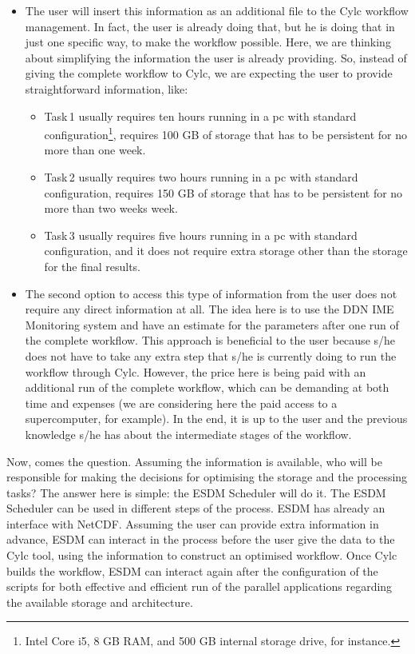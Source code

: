 \documentclass[a4paper]{article}
\begin{document}
\begin{itemize}

\item The user will insert this information as an additional file to the Cylc workflow management. In fact, the user is already doing that, but he is doing that in just one specific way, to make the workflow possible. Here, we are thinking about simplifying the information the user is already providing. So, instead of giving the complete workflow to Cylc, we are expecting the user to provide straightforward information, like:

\begin{itemize}

\item Task\,1 usually requires ten hours running in a pc with standard configuration\footnote{Intel Core i5, 8 GB RAM, and 500 GB internal storage drive, for instance.}, requires 100 GB of storage that has to be persistent for no more than one week.

\item Task\,2 usually requires two hours running in a pc with standard configuration, requires 150 GB of storage that has to be persistent for no more than two weeks week.

\item Task\,3 usually requires five hours running in a pc with standard configuration, and it does not require extra storage other than the storage for the final results.

\end{itemize}

\item The second option to access this type of information from the user does not require any direct information at all. The idea here is to use the DDN IME Monitoring system and have an estimate for the parameters after one run of the complete workflow. This approach is beneficial to the user because s/he does not have to take any extra step that s/he is currently doing to run the workflow through Cylc. However, the price here is being paid with an additional run of the complete workflow, which can be demanding at both time and expenses (we are considering here the paid access to a supercomputer, for example). In the end, it is up to the user and the previous knowledge s/he has about the intermediate stages of the workflow.

\end{itemize}

Now, comes the question. Assuming the information is available, who will be responsible for making the decisions for optimising the storage and the processing tasks? The answer here is simple: the ESDM Scheduler will do it. The ESDM Scheduler can be used in different steps of the process. ESDM has already an interface with NetCDF. Assuming the user can provide extra information in advance, ESDM can interact in the process before the user give the data to the Cylc tool, using the information to construct an optimised workflow. Once Cylc builds the workflow, ESDM can interact again after the configuration of the scripts for both effective and efficient run of the parallel applications regarding the available storage and architecture.
\end{document}
